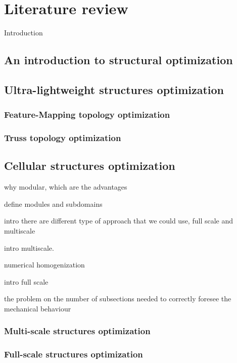 \setchapterpreamble[u]{\margintoc}
\glsresetall %

\chapter{Literature review}
Introduction
\section{An introduction to structural optimization}

\section{Ultra-lightweight structures optimization}

\subsection{Feature-Mapping topology optimization}

\subsection{Truss topology optimization}

\section{Cellular structures optimization}
why modular, which are the advantages

define modules and subdomains

intro there are different type of approach that we could use, full scale and multiscale

intro multiscale.

numerical homogenization

intro full scale

the problem on the number of subsections needed to correctly foresee the mechanical behaviour

\subsection{Multi-scale structures optimization}

\subsection{Full-scale structures optimization}

